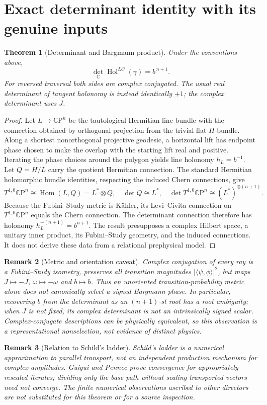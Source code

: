 \documentclass[11pt,letterpaper]{article}
\newtheorem{theorem}{Theorem}
\newtheorem{remark}[theorem]{Remark}
\newcommand{\CP}{\mathbb C\mathrm P}
\begin{document}
\section{Exact determinant identity with its genuine inputs}
\begin{theorem}[Determinant and Bargmann product]\label{thm:det}
Under the conventions above,
\begin{equation}\label{eq:main}
\boxed{\det_{\mathbb C}\operatorname{Hol}^{LC}(\gamma)=b^{\,n+1}.}
\end{equation}
For reversed traversal both sides are complex conjugated. The usual real determinant of tangent holonomy is instead identically \(+1\); the complex determinant uses \(J\).
\end{theorem}
\begin{proof}
Let \(L\rightarrow\CP^n\) be the tautological Hermitian line bundle with the connection obtained by orthogonal projection from the trivial flat \(H\)-bundle. Along a shortest nonorthogonal projective geodesic, a horizontal lift has endpoint phase chosen to make the overlap with the starting lift real and positive. Iterating the phase choices around the polygon yields line holonomy \(h_L=b^{-1}\). Let \(Q=H/L\) carry the quotient Hermitian connection. The standard Hermitian holomorphic bundle identities, respecting the induced Chern connections, give
\[
T^{1,0}\CP^n\cong\operatorname{Hom}(L,Q)=L^*\otimes Q,
\quad \det Q\cong L^*,\quad
\det T^{1,0}\CP^n\cong (L^*)^{\otimes(n+1)}.
\]
Because the Fubini--Study metric is K\"ahler, its Levi--Civita connection on \(T^{1,0}\CP^n\) equals the Chern connection. The determinant connection therefore has holonomy \(h_L^{-(n+1)}=b^{n+1}\). The result presupposes a complex Hilbert space, a unitary inner product, its Fubini--Study geometry, and the induced connections. It does not derive these data from a relational prephysical model.
\end{proof}
\begin{remark}[Metric and orientation caveat]
Complex conjugation of every ray is a Fubini--Study isometry, preserves all transition magnitudes \(|\langle\psi,\phi\rangle|^2\), but maps \(J\mapsto-J\), \(\omega\mapsto-\omega\) and \(b\mapsto\bar b\). Thus an unoriented transition-probability metric alone does not canonically select a signed Bargmann phase. In particular, recovering \(b\) from the determinant as an \((n+1)\)-st root has a root ambiguity; when \(J\) is not fixed, its complex determinant is not an intrinsically signed scalar. Complex-conjugate descriptions can be physically equivalent, so this observation is a representational nonselection, not evidence of distinct physics.
\end{remark}
\begin{remark}[Relation to Schild's ladder]
Schild's ladder is a \emph{numerical approximation} to parallel transport, not an independent production mechanism for complex amplitudes. Guigui and Pennec \cite{guigui} prove convergence for appropriately rescaled iterates; dividing only the base path without scaling transported vectors need not converge. The finite numerical observations ascribed to other directors are not substituted for this theorem or for a source inspection.
\end{remark}
\end{document}
